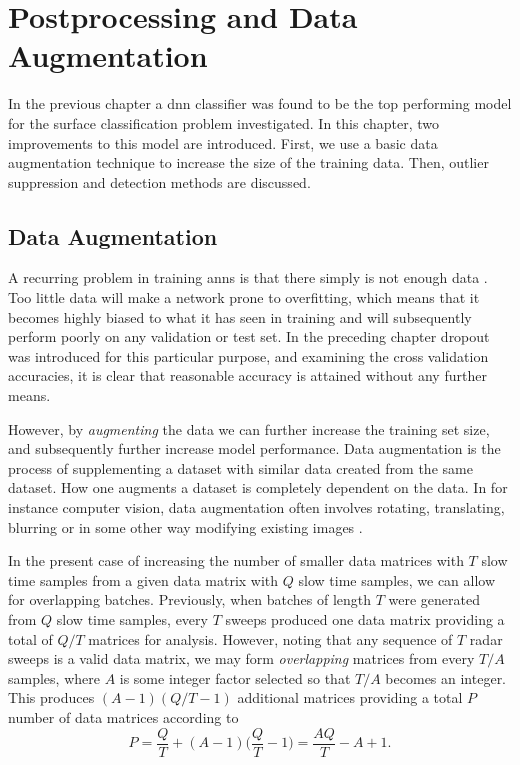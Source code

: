 \chapter{Postprocessing and Data Augmentation}

In the previous chapter a \gls{dnn} classifier was found to be the top performing model for the surface classification problem investigated. In this chapter, two improvements to this model are introduced. First, we use a basic data augmentation technique to increase the size of the training data. Then, outlier suppression and detection methods are discussed.

\section{Data Augmentation}

A recurring problem in training \gls{ann}s is that there simply is not enough data \citep{lemley_bazrafkan_corcoran_2017}. Too little data will make a network prone to overfitting, which means that it becomes highly biased to what it has seen in training and will subsequently perform poorly on any validation or test set. In the preceding chapter dropout was introduced for this particular purpose, and examining the cross validation accuracies, it is clear that reasonable accuracy is attained without any further means.

However, by \emph{augmenting} the data we can further increase the training set size, and subsequently further increase model performance. Data augmentation is the process of supplementing a dataset with similar data created from the same dataset. How one augments a dataset is completely dependent on the data. In for instance computer vision, data augmentation often involves rotating, translating, blurring or in some other way modifying existing images \citep{lemley_bazrafkan_corcoran_2017}.

In the present case of increasing the number of smaller data matrices with $T$ slow time samples from a given data matrix with $Q$ slow time samples, we can allow for overlapping batches. Previously, when batches of length $T$ were generated from $Q$ slow time samples, every $T$ sweeps produced one data matrix providing a total of $Q/T$ matrices for analysis. However, noting that any sequence of $T$ radar sweeps is a valid data matrix, we may form \emph{overlapping} matrices from every $T/A$ samples, where $A$ is some integer factor selected so that $T/A$ becomes an integer. This produces $(A-1)(Q/T-1)$ additional matrices providing a total $P$ number of data matrices according to
\begin{equation}
	P = 
	\frac{Q}{T} + (A-1)\Big(\frac{Q}{T} - 1\Big) = 
	\frac{AQ}{T}-A+1.
\end{equation}

